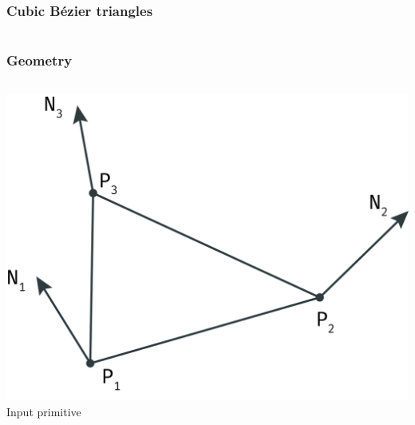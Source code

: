 	\begin{frame}\frametitle{Cubic B\'ezier triangles}
		\begin{columns}
			\begin{column}{0.6\textwidth}
			\end{column}
		\end{columns}
	\end{frame}

	\begin{frame}\frametitle{Geometry}
		\begin{columns}
			\begin{column}{0.6\textwidth}
				\begin{center}
					\includegraphics[width=\textwidth]{img/1_single/inputPrimitive.png}
					\small{Input primitive}
				\end{center}
			\end{column}
		\end{columns}
	\end{frame}


